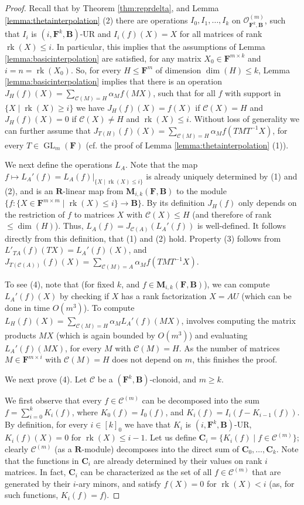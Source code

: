 \documentclass[11pt]{amsart}
\theoremstyle{plain}
\theoremstyle{definition}
\newcommand{\F}{{\mathbf F}}
\newcommand{\alg}[1]{\mathbf{#1}}
\newcommand{\clone}[1]{\mathcal{#1}}
\newcommand{\clonoid}[1]{\mathcal{#1}}
\newcommand{\clodC}{\clonoid{C}}
\newcommand{\clodO}{\clonoid{O}}
\newcommand{\algB}{\alg{B}}
\newcommand{\algC}{\alg{C}}
\newcommand{\algM}{\alg{M}}
\newcommand{\algR}{\alg{R}}
\newcommand{\cloC}{\clone{C}}
\DeclareMathOperator{\rk}{rk}
\DeclareMathOperator{\GL}{GL}
\newcommand{\Col}[1]{\mathcal{C}(#1)}
\begin{document}
\begin{proof}
Recall that by Theorem \ref{thm:reprdelta}, and Lemma \ref{lemma:thetainterpolation} (2) there are operations $I_0,I_1,\ldots,I_k$ on $\clodO_{\F^k,\algB}^{(m)}$, such that $I_i$ is $(i,\F^k,\algB)$-UR and $I_i(f)(X) = X$ for all matrices of rank $\rk(X) \leq i$. In particular, this implies that the assumptions of Lemma \ref{lemma:basicinterpolation} are satisfied, for any matrix $X_0 \in \F^{m\times k}$ and $i=n=\rk(X_0)$. So, for every $H\leq \F^m$ of dimension $\dim(H) \leq k$, Lemma \ref{lemma:basicinterpolation} implies that there is an operation $J_H(f)(X) = \sum_{\Col{M}=H}\alpha_M f(MX)$, such that for all $f$ with support in $\{X \mid \rk(X) \geq i\}$ we have $J_{H}(f)(X) = f(X)$ if $\Col{X} = H$ and $J_H(f)(X) = 0$ if $\Col{X} \neq H$ and $\rk(X) \leq i$. Without loss of generality we can further assume that $J_{T(H)}(f)(X) = \sum_{\Col{M}=H}\alpha_M f(TMT^{-1}X)$, for every $T \in \GL_m(\F)$ (cf. the proof of Lemma \ref{lemma:thetainterpolation} (1)).

We next define the operations $L_A$. Note that the map $f \mapsto L_A'(f) = L_A(f)|_{\{X \mid \rk(X) \leq i\}}$ is already uniquely determined by (1) and (2), and is an $\algR$-linear map from $\algM_{i,k}(\F,\algB)$ to the module $\{f \colon { \{X \in \F^{m\times m} \mid \rk(X) \leq i\}} \to \algB \}$. By its definition $J_H(f)$ only depends on the restriction of $f$ to matrices $X$ with $\Col{X} \leq H$ (and therefore of rank $\leq \dim(H)$). Thus, $L_A(f) = J_{\Col{A}}(L_A'(f))$ is well-defined. It follows directly from this definition, that (1) and (2) hold. Property (3) follows from $L'_{TA}(f)(TX) = L_A'(f)(X)$, and $J_{T(\Col{A})}(f)(X) = \sum_{\Col{M}=A}\alpha_M f(TMT^{-1}X)$.

To see (4), note that (for fixed $k$, and $f \in \algM_{i,k}(\F,\algB)$), we can compute $L_A'(f)(X)$ by checking if $X$ has a rank factorization $X = AU$ (which can be done in time $O(m^3)$). To compute $L_H(f)(X) = \sum_{\Col{M}=H}\alpha_M L_A'(f)(MX)$, involves computing the matrix products $MX$ (which is again bounded by $O(m^3)$) and evaluating $L_A'(f)(MX)$, for every $M$ with $\Col{M} = H$. As the number of matrices $M\in \F^{m\times i}$ with $\Col{M} = H$ does not depend on $m$, this finishes the proof.

We next prove (4). Let $\clodC$ be a $(\F^k,\algB)$-clonoid, and $m\geq k$.

We first observe that every $f \in \clodC^{(m)}$ can be decomposed into the sum $f = \sum_{i=0}^k K_i(f)$, where $K_0(f) = I_0(f)$, and $K_i(f) = I_i(f-K_{i-1}(f))$. By definition, for every $i \in [k]_0$ we have that $K_i$ is $(i,\F^k,\algB)$-UR, $K_i(f)(X) = 0$ for $\rk(X) \leq i-1$. Let us define $\algC_i = \{K_i(f) \mid f \in \cloC^{(m)}\}$; clearly $\clodC^{(m)}$ (as a $\algR$-module) decomposes into the direct sum of $\algC_0,\ldots,\algC_k$. Note that the functions in $\algC_i$ are already determined by their values on rank $i$ matrices. In fact, $\algC_i$ can be characterized as the set of all $f \in \clodC^{(m)}$ that are generated by their $i$-ary minors, and satisfy $f(X) = 0$ for $\rk(X) < i$ (as, for such functions, $K_i(f) = f$).


\end{proof}
\end{document}
